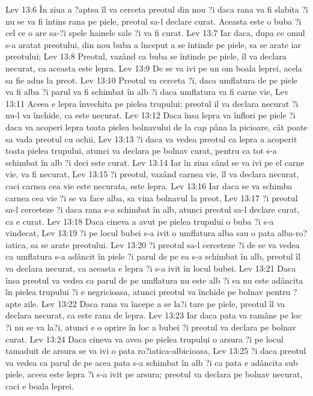 Lev 13:6  În ziua a ?aptea îl va cerceta preotul din nou ?i daca rana va fi slabita ?i nu se va fi întins rana pe piele, preotul sa-l declare curat. Aceasta este o buba ?i cel ce o are sa-?i spele hainele sale ?i va fi curat.
Lev 13:7  Iar daca, dupa ce omul s-a aratat preotului, din nou buba a început a se întinde pe piele, sa se arate iar preotului;
Lev 13:8  Preotul, vazând ca buba se întinde pe piele, îl va declara necurat, ca aceasta este lepra.
Lev 13:9  De se va ivi pe un om boala leprei, acela sa fie adus la preot.
Lev 13:10  Preotul va cerceta ?i, daca umflatura de pe piele va fi alba ?i parul va fi schimbat în alb ?i daca umflatura va fi carne vie,
Lev 13:11  Aceea e lepra învechita pe pielea trupului; preotul il va declara necurat ?i nu-l va închide, ca este necurat.
Lev 13:12  Daca însa lepra va înflori pe piele ?i daca va acoperi lepra toata pielea bolnavului de la cap pâna la picioare, cât poate sa vada preotul cu ochii,
Lev 13:13  ?i daca va vedea preotul ca lepra a acoperit toata pielea trupului, atunci va declara pe bolnav curat, pentru ca tot s-a schimbat în alb ?i deci este curat.
Lev 13:14  Iar în ziua când se va ivi pe el carne vie, va fi necurat,
Lev 13:15  ?i preotul, vazând carnea vie, îl va declara necurat, caci carnea cea vie este necurata, este lepra.
Lev 13:16  Iar daca se va schimba carnea cea vie ?i se va face alba, sa vina bolnavul la preot,
Lev 13:17  ?i preotul sa-l cerceteze ?i daca rana s-a schimbat în alb, atunci preotul sa-l declare curat, ca e curat.
Lev 13:18  Daca cineva a avut pe pielea trupului o buba ?i s-a vindecat,
Lev 13:19  ?i pe locul bubei s-a ivit o umflatura alba sau o pata alba-ro?iatica, sa se arate preotului.
Lev 13:20  ?i preotul sa-l cerceteze ?i de se va vedea ca umflatura s-a adâncit în piele ?i parul de pe ea s-a schimbat în alb, preotul îl va declara necurat, ca aceasta e lepra ?i s-a ivit în locul bubei.
Lev 13:21  Daca însa preotul va vedea ca parul de pe umflatura nu este alb ?i ea nu este adâncita în pielea trupului ?i e negricioasa, atunci preotul va închide pe bolnav pentru ?apte zile.
Lev 13:22  Daca rana va începe a se la?i tare pe piele, preotul îl va declara necurat, ca este rana de lepra.
Lev 13:23  Iar daca pata va ramâne pe loc ?i nu se va la?i, atunci e o oprire în loc a bubei ?i preotul va declara pe bolnav curat.
Lev 13:24  Daca cineva va avea pe pielea trupului o arsura ?i pe locul tamaduit de arsura se va ivi o pata ro?iatica-albicioasa,
Lev 13:25  ?i daca preotul va vedea ca parul de pe acea pata s-a schimbat în alb ?i ca pata e adâncita sub piele, aceea este lepra ?i s-a ivit pe arsura; preotul va declara pe bolnav necurat, caci e boala leprei.
